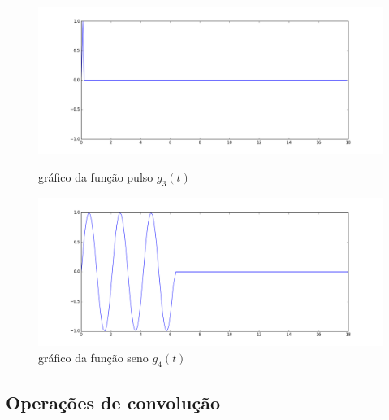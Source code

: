\documentclass[12pt]{article}
\begin{document}
\begin{figure}[!h]
	\begin{minipage}[b]{0.49\linewidth}
		\includegraphics[width=1.15\linewidth]{g3.png}
		\caption{gráfico da função pulso $g_3(t)$}
	\end{minipage}
	\hfill
	\begin{minipage}[b]{0.49\linewidth}
		\includegraphics[width=1.15\linewidth]{g4.png}
		\caption{gráfico da função seno $g_4(t)$}
	\end{minipage}
\end{figure}

	
\subsection{Operações de convolução}
\end{document}
